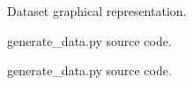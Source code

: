 \documentclass[11pt]{article}
\begin{document}
	\begin{figure}[H]
		\caption{Dataset graphical representation.}
	\end{figure} 
	 
	
	\begin{figure}[H]
		\caption{generate\_data.py source code.}
	\end{figure}
	
\begin{figure}[H]
		\caption{generate\_data.py source code.}
	\end{figure}
\end{document}
